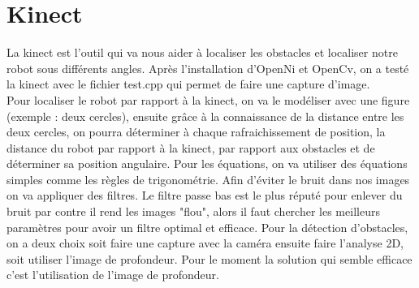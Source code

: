 \section{Kinect}
La kinect est l’outil qui va nous aider à localiser les obstacles et localiser notre robot sous différents angles. Après l’installation d’OpenNi et OpenCv, on a testé la kinect avec le fichier test.cpp qui permet de faire une capture d’image.\\
Pour localiser le robot par rapport à la kinect, on va le modéliser avec une figure (exemple : deux cercles), ensuite  grâce à la connaissance de la distance entre les deux cercles, on pourra déterminer à chaque rafraichissement de position, la distance du robot par rapport à la kinect, par rapport aux obstacles et de déterminer sa position angulaire. Pour  les équations, on va utiliser des équations simples comme les règles de trigonométrie. Afin d'éviter le bruit dans nos images on va appliquer des filtres. Le filtre passe bas est le plus réputé  pour enlever du bruit par contre il rend les images "flou", alors il faut chercher les meilleurs paramètres pour avoir un filtre optimal et efficace.  Pour la détection d’obstacles, on a deux choix soit faire une capture avec la caméra ensuite faire l’analyse 2D, soit utiliser l’image de profondeur. Pour le moment la solution qui semble efficace c’est l’utilisation de l’image de profondeur.
